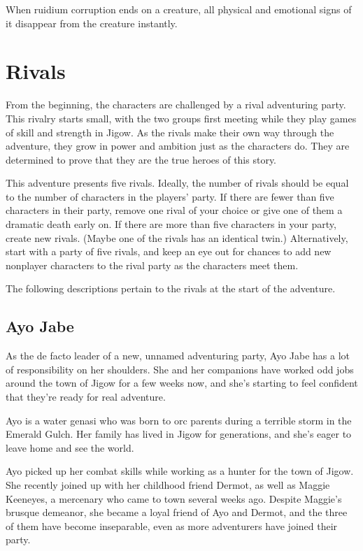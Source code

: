 \documentclass[a4paper, 11pt, bg=full, twocolumn, nooutline]{dndbook}
\begin{document}
When ruidium corruption ends on a creature, all physical and emotional signs of it disappear from the creature instantly.
\section{Rivals}

From the beginning, the characters are challenged by a rival adventuring party. This rivalry starts small, with the two groups first meeting while they play games of skill and strength in Jigow. As the rivals make their own way through the adventure, they grow in power and ambition just as the characters do. They are determined to prove that they are the true heroes of this story.

This adventure presents five rivals. Ideally, the number of rivals should be equal to the number of characters in the players' party. If there are fewer than five characters in their party, remove one rival of your choice or give one of them a dramatic death early on. If there are more than five characters in your party, create new rivals. (Maybe one of the rivals has an identical twin.) Alternatively, start with a party of five rivals, and keep an eye out for chances to add new nonplayer characters to the rival party as the characters meet them.

The following descriptions pertain to the rivals at the start of the adventure.

\subsection{Ayo Jabe}


As the de facto leader of a new, unnamed adventuring party, Ayo Jabe has a lot of responsibility on her shoulders. She and her companions have worked odd jobs around the town of Jigow for a few weeks now, and she's starting to feel confident that they're ready for real adventure.

Ayo is a water genasi who was born to orc parents during a terrible storm in the Emerald Gulch. Her family has lived in Jigow for generations, and she's eager to leave home and see the world.

Ayo picked up her combat skills while working as a hunter for the town of Jigow. She recently joined up with her childhood friend Dermot, as well as Maggie Keeneyes, a mercenary who came to town several weeks ago. Despite Maggie's brusque demeanor, she became a loyal friend of Ayo and Dermot, and the three of them have become inseparable, even as more adventurers have joined their party.
\end{document}

